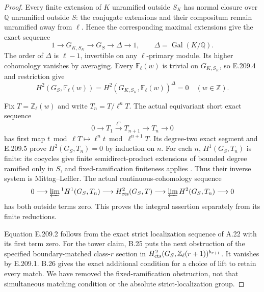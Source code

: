 \begin{proof}
Every finite extension of $K$ unramified outside $S_K$ has
normal closure over $\mathbb Q$ unramified outside $S$:
the conjugate extensions and their compositum remain
unramified away from $\ell$. Hence the corresponding
maximal extensions give the exact sequence
\[
 1\longrightarrow G_{K,S_K}\longrightarrow G_S
 \longrightarrow\Delta\longrightarrow1,
 \qquad\Delta=\operatorname{Gal}(K/\mathbb Q).
\]
The order of $\Delta$ is $\ell-1$, invertible on any
$\ell$-primary module. Its higher cohomology vanishes by
averaging. Every $\mathbb F_\ell(w)$ is trivial on
$G_{K,S_K}$, so E.209.4 and restriction give
\[
 H^2(G_S,\mathbb F_\ell(w))
  =H^2(G_{K,S_K},\mathbb F_\ell(w))^\Delta=0
 \quad(w\in\mathbb Z).                                        \tag{E.209.5}
\]

Fix $T=\mathbb Z_\ell(w)$ and write $T_n=T/\ell^nT$.
The actual equivariant short exact sequence
\[
 0\longrightarrow T_1\xrightarrow{\ \ell^n\ }T_{n+1}
 \longrightarrow T_n\longrightarrow0
\]
has first map $t\bmod\ell T\mapsto\ell^nt\bmod\ell^{n+1}T$.
Its degree-two exact segment and E.209.5 prove
$H^2(G_S,T_n)=0$ by induction on $n$.
For each $n$, $H^1(G_S,T_n)$ is finite: its cocycles give
finite semidirect-product extensions of bounded degree
ramified only in $S$, and fixed-ramification finiteness
applies \citep[Theorem8.42, p.~151]{CohMilneANT}.
Thus their inverse system is Mittag--Leffler. The actual
continuous-cohomology sequence
\citep[(2.1) and Theorem2.2, p.~215]{CohJannsen1988}
\[
 0\longrightarrow\varprojlim{}^1 H^1(G_S,T_n)
 \longrightarrow H^2_{\rm cts}(G_S,T)
 \longrightarrow\varprojlim H^2(G_S,T_n)\longrightarrow0
\]
has both outside terms zero. This proves the integral
assertion separately from its finite reductions.

Equation E.209.2 follows from the exact strict localization
sequence of A.22 with its first term zero. For the tower
claim, B.25 puts the next obstruction of the specified
boundary-matched class-$r$ section in
$H^2_{\rm cts}(G_S,\mathbb Z_\ell(r+1))^{b_{r+1}}$.
It vanishes by E.209.1. B.26 gives the exact additional
condition for a choice of lift to retain every match.
We have removed the fixed-ramification obstruction, not
that simultaneous matching condition or the absolute
strict-localization group.
\end{proof}

